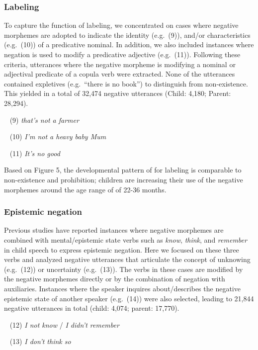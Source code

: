\documentclass[10pt, letterpaper]{article}
\begin{document}
\hypertarget{labeling}{%
\subsubsection{Labeling}\label{labeling}}

To capture the function of labeling, we concentrated on cases where
negative morphemes are adopted to indicate the identity (e.g.~(9)),
and/or characteristics (e.g.~(10)) of a predicative nominal. In
addition, we also included instances where negation is used to modify a
predicative adjective (e.g.~(11)). Following these criteria, utterances
where the negative morpheme is modifying a nominal or adjectival
predicate of a copula verb were extracted. None of the utterances
contained expletives (e.g.~``there is no book'') to distinguish from
non-existence. This yielded in a total of 32,474 negative utterances
(Child: 4,180; Parent: 28,294).

~ (9) \emph{that's not a farmer}

~ (10) \emph{I'm not a heavy baby Mum}

~ (11) \emph{It's no good}

Based on Figure 5, the developmental pattern of for labeling is
comparable to non-existence and prohibition; children are increasing
their use of the negative morphemes around the age range of of 22-36
months.

\hypertarget{epistemic-negation}{%
\subsubsection{Epistemic negation}\label{epistemic-negation}}

Previous studies have reported instances where negative morphemes are
combined with mental/epistemic state verbs such as \emph{know},
\emph{think}, and \emph{remember} in child speech to express epistemic
negation. Here we focused on these three verbs and analyzed negative
utterances that articulate the concept of unknowing (e.g.~(12)) or
uncertainty (e.g.~(13)). The verbs in these cases are modified by the
negative morphemes directly or by the combination of negation with
auxiliaries. Instances where the speaker inquires about/describes the
negative epistemic state of another speaker (e.g.~(14)) were also
selected, leading to 21,844 negative utterances in total (child: 4,074;
parent: 17,770).

~ (12) \emph{I not know} / \emph{I didn't remember}

~ (13) \emph{I don't think so}
\end{document}
